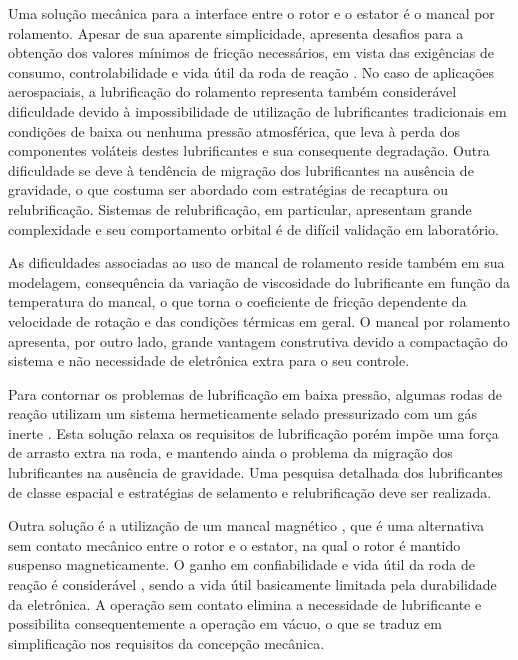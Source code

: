 Uma solução mecânica para a interface entre o rotor e o estator é o mancal por rolamento. Apesar de sua aparente simplicidade, apresenta desafios para a obtenção dos valores mínimos de fricção necessários, em vista das exigências de consumo, controlabilidade e vida útil da roda de reação \citep{Krishnan2010}. No caso de aplicações aerospaciais, a lubrificação do rolamento representa também considerável dificuldade devido à impossibilidade de utilização de lubrificantes tradicionais em condições de baixa ou nenhuma pressão atmosférica, que leva à perda dos componentes voláteis destes lubrificantes e sua consequente degradação. Outra dificuldade se deve à tendência de migração dos lubrificantes na ausência de gravidade, o que costuma ser abordado com estratégias de recaptura ou relubrificação. Sistemas de relubrificação, em particular, apresentam grande complexidade e seu comportamento orbital é de difícil validação em laboratório.

As dificuldades associadas ao uso de mancal de rolamento reside também em sua modelagem, consequência da variação de viscosidade do lubrificante em função da temperatura do mancal, o que torna o coeficiente de fricção dependente da velocidade de rotação e das condições térmicas em geral. O mancal por rolamento apresenta, por outro lado, grande vantagem construtiva devido a compactação do sistema e não necessidade de eletrônica extra para o seu controle. 

Para contornar os problemas de lubrificação em baixa pressão, algumas rodas de reação  utilizam um sistema hermeticamente selado pressurizado com um gás inerte \citep{Krishnan2010}. Esta solução relaxa os requisitos de lubrificação porém impõe uma força de arrasto extra na roda, e mantendo ainda o problema da migração dos lubrificantes na ausência de gravidade. Uma pesquisa detalhada dos lubrificantes de classe espacial e estratégias de selamento e relubrificação deve ser realizada.

Outra solução é a utilização de um mancal magnético \citep{Bangcheng2012},  que é uma alternativa sem contato mecânico entre o rotor e o estator, na qual o rotor é mantido suspenso magneticamente. O ganho em confiabilidade e vida útil da roda de reação é considerável \citep{Marble2006}, sendo a vida útil basicamente limitada  pela durabilidade da eletrônica. A operação sem contato elimina a necessidade de lubrificante e possibilita consequentemente a operação em vácuo, o que se traduz em simplificação nos requisitos da concepção mecânica. 

